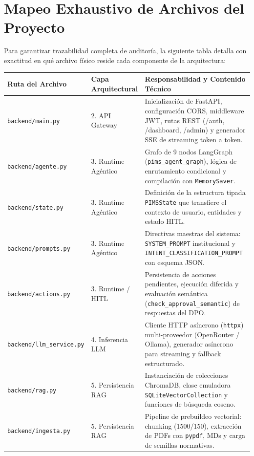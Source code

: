 \documentclass[11pt,a4paper]{article}
\begin{document}
\section{Mapeo Exhaustivo de Archivos del Proyecto}

Para garantizar trazabilidad completa de auditoría, la siguiente tabla detalla con exactitud en qué archivo físico reside cada componente de la arquitectura:

\begin{longtable}{@{}p{5cm}p{3.5cm}p{7.5cm}@{}}
\toprule
\textbf{Ruta del Archivo} & \textbf{Capa Arquitectural} & \textbf{Responsabilidad y Contenido Técnico} \\ \midrule
\endhead
\texttt{backend/main.py} & 2. API Gateway & Inicialización de FastAPI, configuración CORS, middleware JWT, rutas REST (/auth, /dashboard, /admin) y generador SSE de streaming token a token. \\ \midrule
\texttt{backend/agente.py} & 3. Runtime Agéntico & Grafo de 9 nodos LangGraph (\texttt{pims\_agent\_graph}), lógica de enrutamiento condicional y compilación con \texttt{MemorySaver}. \\ \midrule
\texttt{backend/state.py} & 3. Runtime Agéntico & Definición de la estructura tipada \texttt{PIMSState} que transfiere el contexto de usuario, entidades y estado HITL. \\ \midrule
\texttt{backend/prompts.py} & 3. Runtime Agéntico & Directivas maestras del sistema: \texttt{SYSTEM\_PROMPT} institucional y \texttt{INTENT\_CLASSIFICATION\_PROMPT} con esquema JSON. \\ \midrule
\texttt{backend/actions.py} & 3. Runtime / HITL & Persistencia de acciones pendientes, ejecución diferida y evaluación semántica (\texttt{check\_approval\_semantic}) de respuestas del DPO. \\ \midrule
\texttt{backend/llm\_service.py} & 4. Inferencia LLM & Cliente HTTP asíncrono (\texttt{httpx}) multi-proveedor (OpenRouter / Ollama), generador asíncrono para streaming y fallback estructurado. \\ \midrule
\texttt{backend/rag.py} & 5. Persistencia RAG & Instanciación de colecciones ChromaDB, clase emuladora \texttt{SQLiteVectorCollection} y funciones de búsqueda coseno. \\ \midrule
\texttt{backend/ingesta.py} & 5. Persistencia RAG & Pipeline de prebuildeo vectorial: chunking (1500/150), extracción de PDFs con \texttt{pypdf}, MDs y carga de semillas normativas. \\ \midrule

\end{longtable}
\end{document}
